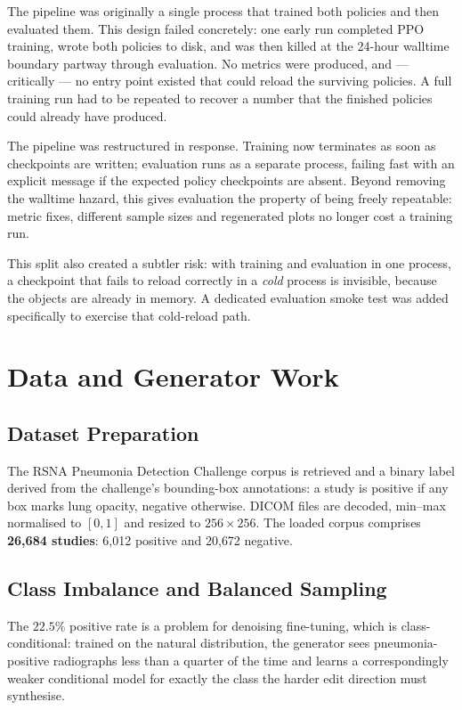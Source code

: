 The pipeline was originally a single process that trained both policies
and then evaluated them. This design failed concretely: one early run
completed PPO training, wrote both policies to disk, and was then killed
at the 24-hour walltime boundary partway through evaluation. No metrics
were produced, and --- critically --- no entry point existed that could
reload the surviving policies. A full training run had to be repeated to
recover a number that the finished policies could already have produced.

The pipeline was restructured in response. Training now terminates as
soon as checkpoints are written; evaluation runs as a separate process,
failing fast with an explicit message if the expected policy checkpoints
are absent. Beyond removing the walltime hazard, this gives evaluation
the property of being freely repeatable: metric fixes, different sample
sizes and regenerated plots no longer cost a training run.

This split also created a subtler risk: with training and evaluation in
one process, a checkpoint that fails to reload correctly in a \emph{cold}
process is invisible, because the objects are already in memory. A
dedicated evaluation smoke test was added specifically to exercise that
cold-reload path.

\section{Data and Generator Work}

\subsection{Dataset Preparation}

The RSNA Pneumonia Detection Challenge corpus is retrieved and a binary
label derived from the challenge's bounding-box annotations: a study is
positive if any box marks lung opacity, negative otherwise. DICOM files
are decoded, min--max normalised to $[0,1]$ and resized to
$256\times256$. The loaded corpus comprises \textbf{26{,}684 studies}:
6{,}012 positive and 20{,}672 negative.

\subsection{Class Imbalance and Balanced Sampling}

The $22.5\%$ positive rate is a problem for denoising fine-tuning, which
is class-conditional: trained on the natural distribution, the generator
sees pneumonia-positive radiographs less than a quarter of the time and
learns a correspondingly weaker conditional model for exactly the class
the harder edit direction must synthesise.

